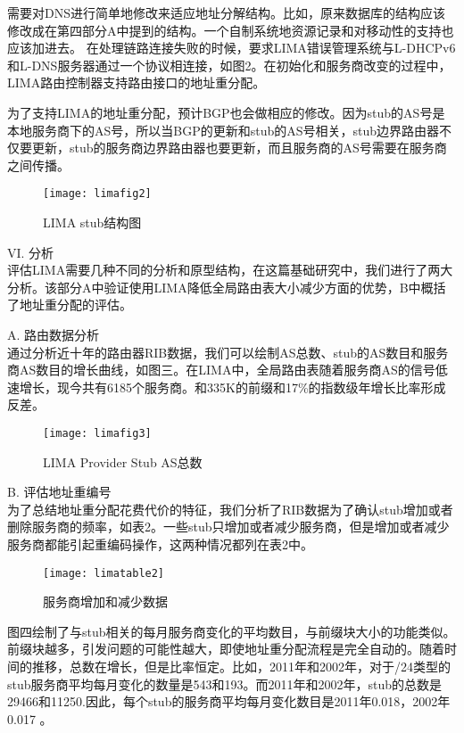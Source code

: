 需要对DNS进行简单地修改来适应地址分解结构。比如，原来数据库的结构应该修改成在第四部分A中提到的结构。一个自制系统地资源记录和对移动性的支持也应该加进去。
在处理链路连接失败的时候，要求LIMA错误管理系统与L-DHCPv6和L-DNS服务器通过一个协议相连接，如图2。在初始化和服务商改变的过程中，LIMA路由控制器支持路由接口的地址重分配。


为了支持LIMA的地址重分配，预计BGP也会做相应的修改。因为stub的AS号是本地服务商下的AS号，所以当BGP的更新和stub的AS号相关，stub边界路由器不仅要更新，stub的服务商边界路由器也要更新，而且服务商的AS号需要在服务商之间传播。

\begin{figure}
  \centering
  \texttt{[image: limafig2]}\\
  \caption{LIMA stub结构图}\label{fig:limafig2}
\end{figure}

VI.	分析\\
评估LIMA需要几种不同的分析和原型结构，在这篇基础研究中，我们进行了两大分析。该部分A中验证使用LIMA降低全局路由表大小减少方面的优势，B中概括了地址重分配的评估。


A.	路由数据分析\\
通过分析近十年的路由器RIB数据，我们可以绘制AS总数、stub的AS数目和服务商AS数目的增长曲线，如图三。在LIMA中，全局路由表随着服务商AS的信号低速增长，现今共有6185个服务商。和335K的前缀和17\%的指数级年增长比率形成反差。

\begin{figure}
  \centering
  \texttt{[image: limafig3]}\\
  \caption{LIMA Provider Stub AS总数}\label{fig:limafig3}
\end{figure}

B.	评估地址重编号\\
为了总结地址重分配花费代价的特征，我们分析了RIB数据为了确认stub增加或者删除服务商的频率，如表2。一些stub只增加或者减少服务商，但是增加或者减少服务商都能引起重编码操作，这两种情况都列在表2中。

\begin{figure}
  \centering
  \texttt{[image: limatable2]}\\
  \caption{服务商增加和减少数据}\label{fig:limatable2}
\end{figure}

图四绘制了与stub相关的每月服务商变化的平均数目，与前缀块大小的功能类似。前缀块越多，引发问题的可能性越大，即使地址重分配流程是完全自动的。随着时间的推移，总数在增长，但是比率恒定。比如，2011年和2002年，对于/24类型的stub服务商平均每月变化的数量是543和193。而2011年和2002年，stub的总数是29466和11250.因此，每个stub的服务商平均每月变化数目是2011年0.018，2002年0.017 。

